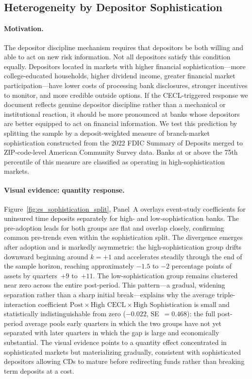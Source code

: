 \subsection{Heterogeneity by Depositor Sophistication}
\label{sec:results:sophistication}

\paragraph{Motivation.}
The depositor discipline mechanism requires that depositors be both willing and
able to act on new risk information.  Not all depositors satisfy this condition
equally.  Depositors located in markets with higher financial
sophistication---more college-educated households, higher dividend income, greater
financial market participation---have lower costs of processing bank disclosures,
stronger incentives to monitor, and more credible outside options.  If the
CECL-triggered response we document reflects genuine depositor discipline rather
than a mechanical or institutional reaction, it should be more pronounced at banks
whose depositors are better equipped to act on financial information.  We test
this prediction by splitting the sample by a deposit-weighted measure of
branch-market sophistication constructed from the 2022 FDIC Summary of Deposits
merged to ZIP-code-level American Community Survey data.  Banks at or above the
75th percentile of this measure are classified as operating in
high-sophistication markets.

\paragraph{Visual evidence: quantity response.}
Figure~\ref{fig:es_sophistication_split}, Panel~A overlays event-study
coefficients for uninsured time deposits separately for high- and
low-sophistication banks.  The pre-adoption leads for both groups are flat and
overlap closely, confirming common pre-trends even within the sophistication
split.  The divergence emerges after adoption and is markedly asymmetric: the
high-sophistication group drifts downward beginning around $k=+1$ and accelerates
steadily through the end of the sample horizon, reaching approximately $-1.5$ to
$-2$ percentage points of assets by quarters~$+9$ to~$+11$.  The
low-sophistication group remains clustered near zero across the entire post-period.
This pattern---a gradual, widening separation rather than a sharp initial
break---explains why the average triple-interaction coefficient
$\text{Post} \times \text{High CECL} \times \text{High Sophistication}$ is small
and statistically indistinguishable from zero ($-0.022$, SE~$= 0.468$): the full
post-period average pools early quarters in which the two groups have not yet
separated with later quarters in which the gap is large and economically
substantial.  The visual evidence points to a quantity effect concentrated in
sophisticated markets but materializing gradually, consistent with sophisticated
depositors allowing CDs to mature before redirecting funds rather than breaking
term deposits at a cost.

